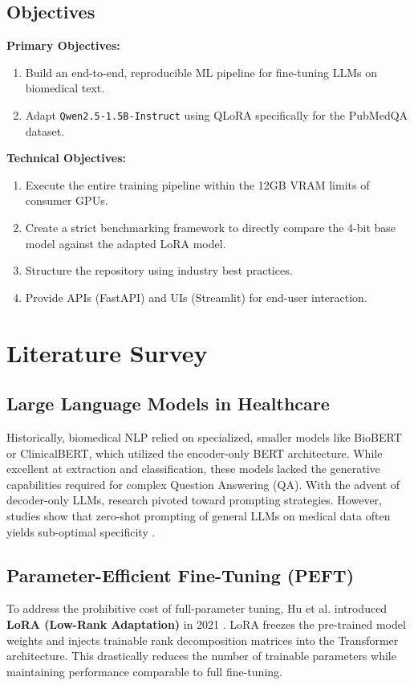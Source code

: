 \documentclass[12pt,a4paper]{report}
\begin{document}
\section{Objectives}
\textbf{Primary Objectives:}
\begin{enumerate}
    \item Build an end-to-end, reproducible ML pipeline for fine-tuning LLMs on biomedical text.
    \item Adapt \texttt{Qwen2.5-1.5B-Instruct} using QLoRA specifically for the PubMedQA dataset.
\end{enumerate}

\textbf{Technical Objectives:}
\begin{enumerate}
    \item Execute the entire training pipeline within the 12GB VRAM limits of consumer GPUs.
    \item Create a strict benchmarking framework to directly compare the 4-bit base model against the adapted LoRA model.
    \item Structure the repository using industry best practices.
    \item Provide APIs (FastAPI) and UIs (Streamlit) for end-user interaction.
\end{enumerate}

\chapter{Literature Survey}

\section{Large Language Models in Healthcare}
Historically, biomedical NLP relied on specialized, smaller models like BioBERT or ClinicalBERT, which utilized the encoder-only BERT architecture. While excellent at extraction and classification, these models lacked the generative capabilities required for complex Question Answering (QA). With the advent of decoder-only LLMs, research pivoted toward prompting strategies. However, studies show that zero-shot prompting of general LLMs on medical data often yields sub-optimal specificity \cite{pubmedqa}.

\section{Parameter-Efficient Fine-Tuning (PEFT)}
To address the prohibitive cost of full-parameter tuning, Hu et al. introduced \textbf{LoRA (Low-Rank Adaptation)} in 2021 \cite{lora}. LoRA freezes the pre-trained model weights and injects trainable rank decomposition matrices into the Transformer architecture. This drastically reduces the number of trainable parameters while maintaining performance comparable to full fine-tuning.
\end{document}

